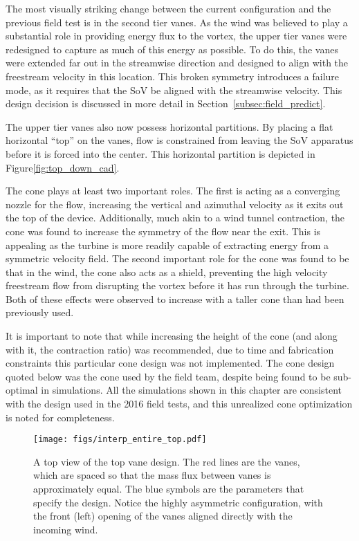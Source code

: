 The most visually striking change between the current configuration and
the previous field test is in the second tier vanes. As the wind was
believed to play a substantial role in providing energy flux to the
vortex, the upper tier vanes were redesigned to capture as much of this
energy as possible. To do this, the vanes were extended far out in the
streamwise direction and designed to align with the freestream velocity
in this location. This broken symmetry introduces a failure mode, as it
requires that the SoV be aligned with the streamwise velocity. This
design decision is discussed in more detail in
Section~\ref{subsec:field_predict}. 

The upper tier vanes also now possess horizontal partitions. By placing
a flat horizontal ``top'' on the vanes, flow is constrained from leaving
the SoV apparatus before it is forced into the center. This horizontal
partition is depicted in Figure\ref{fig:top_down_cad}. 

The cone plays at least two important roles. The first is acting as a
converging nozzle for the flow, increasing the vertical and azimuthal
velocity as it exits out the top of the device. Additionally, much akin
to a wind tunnel contraction, the cone was found to increase the
symmetry of the flow near the exit. This is appealing as the turbine is
more readily capable of extracting energy from a symmetric velocity
field. The second important role for the cone was found to be that in
the wind, the cone also acts as a shield, preventing the high velocity
freestream flow from disrupting the vortex before it has run through the
turbine. Both of these effects were observed to increase with a taller
cone than had been previously used.

It is important to note that while increasing the height of the cone
(and along with it, the contraction ratio) was recommended, due to
time and fabrication constraints this particular cone design was not
implemented. The cone design quoted below was the cone used by
the field team, despite being found to be sub-optimal in
simulations. All the simulations shown in this chapter are consistent
with the design used in the 2016 field tests, and this unrealized cone
optimization is noted for completeness.

 \begin{figure}[!htb]
  \begin{center}
   \texttt{[image: figs/interp\_entire\_top.pdf]}
   \caption{A top view of the top vane design. The red lines are the
     vanes, which are spaced so that the mass flux between vanes is
     approximately equal. The blue symbols are the parameters that
     specify the design. Notice the highly asymmetric configuration,
     with the front (left) opening of the vanes aligned directly with
     the incoming wind.}
   \label{fig:top_design}
  \end{center}
 \end{figure}


